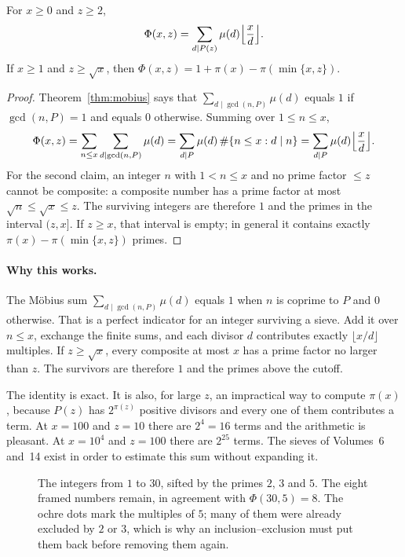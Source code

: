 \begin{theorem}[Legendre]\label{thm:t1-sieve}
For $x\ge0$ and $z\ge2$,
\[
\Phi(x,z)=\sum_{d\mid P(z)}\mu(d)\Bigl\lfloor\frac xd\Bigr\rfloor.
\]
If $x\ge1$ and $z\ge\sqrt x$, then
$\Phi(x,z)=1+\pi(x)-\pi(\min\{x,z\})$.
\end{theorem}
\begin{proof}
Theorem~\ref{thm:mobius} says that $\sum_{d\mid\gcd(n,P)}\mu(d)$ equals $1$ if $\gcd(n,P)=1$ and equals $0$ otherwise. Summing over $1\le n\le x$,
\[
\Phi(x,z)=\sum_{n\le x}\sum_{d\mid\gcd(n,P)}\mu(d)
=\sum_{d\mid P}\mu(d)\,\#\{n\le x:d\mid n\}
=\sum_{d\mid P}\mu(d)\Bigl\lfloor\frac xd\Bigr\rfloor.
\]
For the second claim, an integer $n$ with $1<n\le x$ and no prime factor $\le z$ cannot be composite: a composite number has a prime factor at most $\sqrt n\le\sqrt x\le z$. The surviving integers are therefore $1$ and the primes in the interval $(z,x]$.
If $z\ge x$, that interval is empty; in general it contains exactly
$\pi(x)-\pi(\min\{x,z\})$ primes.
\end{proof}

\paragraph{Why this works.}
The Möbius sum $\sum_{d\mid\gcd(n,P)}\mu(d)$ equals $1$ when $n$ is coprime to $P$ and $0$ otherwise. That is a perfect indicator for an integer surviving a sieve. Add it over $n\le x$, exchange the finite sums, and each divisor $d$ contributes exactly $\lfloor x/d\rfloor$ multiples. If $z\ge\sqrt x$, every composite at most $x$ has a prime factor no larger than $z$. The survivors are therefore $1$ and the primes above the cutoff.

The identity is exact. It is also, for large $z$, an impractical way to compute $\pi(x)$, because $P(z)$ has $2^{\pi(z)}$ positive divisors and every one of them contributes a term. At $x=100$ and $z=10$ there are $2^4=16$ terms and the arithmetic is pleasant. At $x=10^4$ and $z=100$ there are $2^{25}$ terms. The sieves of Volumes~6 and~14 exist in order to estimate this sum without expanding it.

\begin{figure}[ht]
\centering
{}
\caption{The integers from $1$ to $30$, sifted by the primes $2$, $3$ and $5$. The eight framed numbers remain, in agreement with $\Phi(30,5)=8$. The ochre dots mark the multiples of $5$; many of them were already excluded by $2$ or $3$, which is why an inclusion--exclusion must put them back before removing them again.}
\label{fig:t1-sieve30}
\end{figure}

